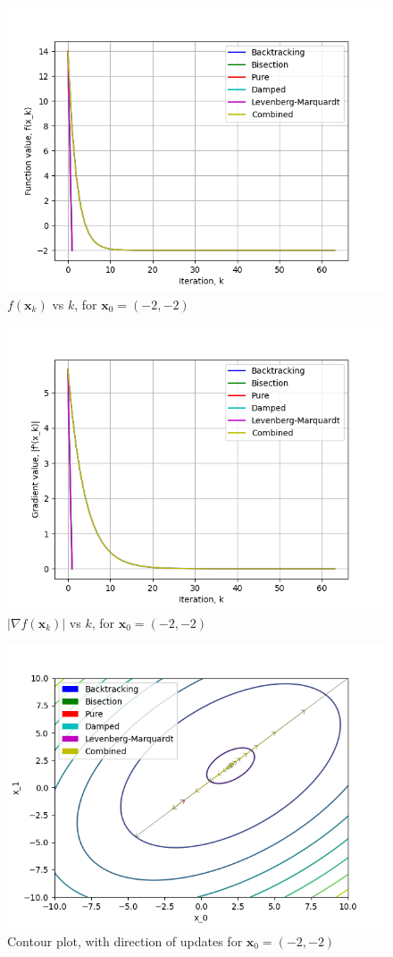 \documentclass[a4paper]{article}
\begin{document}
\begin{figure}[H]
      \centering
      \includegraphics[width=.75\textwidth]{trid_function_vals.png}
      \caption{$f(\textbf{x}_k)$ vs $k$, for $\textbf{x}_0 = (-2, -2)$}
\end{figure}

\begin{figure}[H]
    \centering
    \includegraphics[width=.75\textwidth]{trid_function_grad.png}
    \caption{$|\nabla f(\textbf{x}_k)|$ vs $k$, for $\textbf{x}_0 = (-2, -2)$}
\end{figure}

\begin{figure}[H]
    \centering
    \includegraphics[width=.75\textwidth]{trid_function_cont.png}
    \caption{Contour plot, with direction of updates for $\textbf{x}_0 = (-2, -2)$}
\end{figure}
\end{document}
